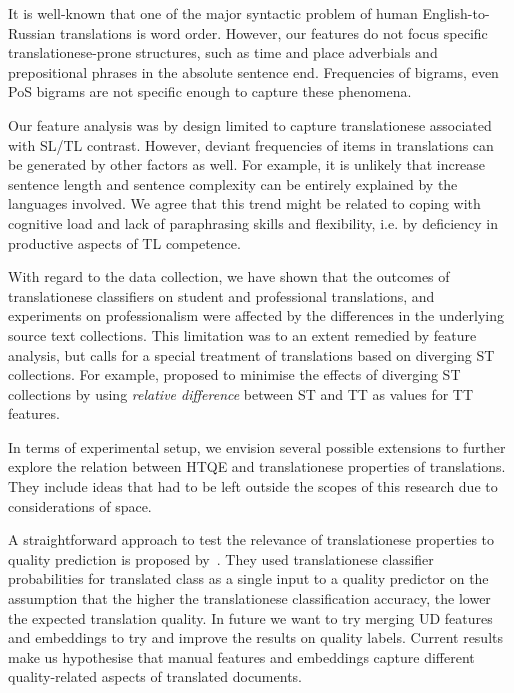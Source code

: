 It is well-known that one of the major syntactic problem of human English-to-Russian translations is word order. However, our features do not focus specific translationese-prone structures, such as time and place adverbials and prepositional phrases in the absolute sentence end. Frequencies of bigrams, even PoS bigrams are not specific enough to capture these phenomena.

Our feature analysis was by design limited to capture translationese associated with SL/TL contrast.
However, deviant frequencies of items in translations can be generated by other factors as well. For example, it is unlikely that increase sentence length and sentence complexity can be entirely explained by the languages involved. We agree that this trend might be related to coping with cognitive load and lack of paraphrasing skills and flexibility, i.e. by deficiency in productive aspects of TL competence.

With regard to the data collection, we have shown that the outcomes of translationese classifiers on student and professional translations, and experiments on professionalism were affected by the differences in the underlying source text collections. This limitation was to an extent remedied by feature analysis, but calls for a special treatment of translations based on diverging ST collections. For example, \citet{Popovic2020} proposed to minimise the effects of diverging ST collections by using \textit{relative difference} between ST and TT as values for TT features.

In terms of experimental setup, we envision several possible extensions to further explore the relation between HTQE and translationese properties of translations. They include ideas that had to be left outside the scopes of this research due to considerations of space. 

A straightforward approach to test the relevance of translationese properties to quality prediction is proposed  by~\citet{Aharoni2015}. They used translationese classifier probabilities for translated class as a single input to a quality predictor on the assumption that the higher the translationese classification accuracy, the lower the expected translation quality.
In future we want to try merging UD features and embeddings to try and improve the results on quality labels. Current results make us hypothesise that manual features and embeddings capture different quality-related aspects of translated documents.

